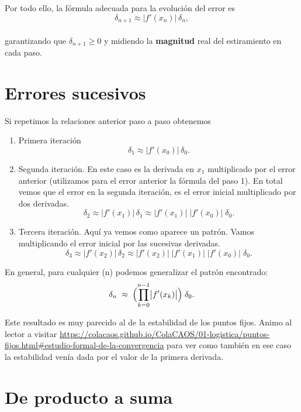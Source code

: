 \documentclass[
  10pt,
  a4paper,
  DIV=11,
  numbers=noendperiod,
  open=any]{scrreprt}
\numberwithin{equation}{chapter}
\numberwithin{equation}{section}
\renewcommand{\[}{\begin{equation}}
\renewcommand{\]}{\end{equation}}
\begin{document}
Por todo ello, la fórmula adecuada para la evolución del error es\\
\[
\delta_{n+1} \approx \bigl|f'(x_n)\bigr|\,\delta_n,
\]\\
garantizando que \(\delta_{n+1}\ge0\) y midiendo la \textbf{magnitud}
real del estiramiento en cada paso.

\section{Errores sucesivos}\label{errores-sucesivos}

Si repetimos la relaciones anterior paso a paso obtenemos

\begin{enumerate}
\def\labelenumi{\arabic{enumi}.}
\item
  Primera iteración\\
  \[
  \delta_1 \approx \bigl|f'(x_0)\bigr|\,\delta_0.
  \]
\item
  Segunda iteración. En este caso es la derivada en \(x_1\) multiplicado
  por el error anterior (utilizamos para el error anterior la fórmula
  del paso 1). En total vemos que el error en la segunda iteración, es
  el error inicial multiplicado por dos derivadas. \[
  \delta_2
  \approx \bigl|f'(x_1)\bigr|\,\delta_1
  \approx \bigl|f'(x_1)\bigr|\;\bigl|f'(x_0)\bigr|\;\delta_0.
  \]
\item
  Tercera iteración. Aquí ya vemos como aparece un patrón. Vamos
  multiplicando el error inicial por las sucesivas derivadas. \[
  \delta_3
  \approx \bigl|f'(x_2)\bigr|\,\delta_2
  \approx \bigl|f'(x_2)\bigr|\;\bigl|f'(x_1)\bigr|\;\bigl|f'(x_0)\bigr|\;\delta_0.
  \]
\end{enumerate}

En general, para cualquier (n) podemos generalizar el patrón
encontrado:\\
\[
\delta_n
\;\approx\;
\Bigl(\prod_{k=0}^{n-1}\bigl|f'(x_k)\bigr|\Bigr)\;\delta_0.
\]


Este resultado es muy parecido al de la estabilidad de los puntos fijos. Animo al lector a visitar \url{https://colacaos.github.io/ColaCAOS/01-logistica/puntos-fijos.html#estudio-formal-de-la-convergencia} para ver como también en ese caso la estabilidad venía dada por el valor de la primera derivada. 

\section{De producto a suma}\label{de-producto-a-suma}
\end{document}
